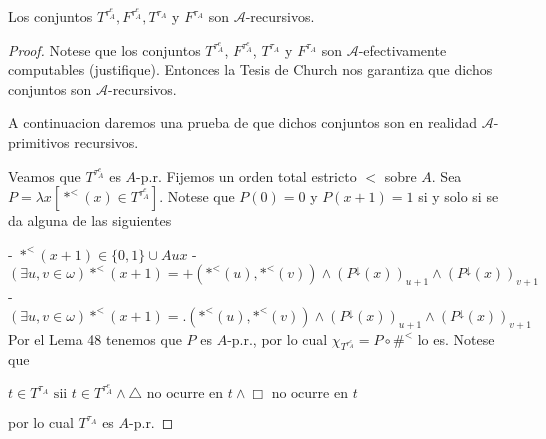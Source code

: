   \begin{lemma} \label{lemma_98}
    \PN Los conjuntos $T^{\tau_{A}^{e}}, F^{\tau_{A}^{e}}, T^{\tau_{A}}$ y $F^{\tau_{A}}$ son $\mathcal{A}$-recursivos.
  \end{lemma}
  \begin{proof}
    \PN Notese que los conjuntos \(T^{\tau _{A}^{e}}\), \(F^{\tau _{A}^{e}}\), \(T^{\tau _{A}}\) y \(F^{\tau _{A}}\) son
    \(\mathcal{A}\)-efectivamente computables (justifique). Entonces la Tesis de Church nos garantiza que dichos conjuntos
    son \(\mathcal{A}\)-recursivos.

    \PN A continuacion daremos una prueba de que dichos conjuntos son en realidad \( \mathcal{A}\)-primitivos recursivos.

    Veamos que $T^{\tau_{A}^{e}}$ es $A$-p.r. Fijemos un orden total estricto $ < $ sobre $A$. Sea $P=\lambda x[\ast ^{< }(x)\in T^{\tau_{A}^{e}}]$. Notese que $P(0)=0$ y $P(x+1)=1$ si y solo si se da alguna de las siguientes

    - $\ast ^{< }(x+1)\in \{0,1\}\cup Aux$
    - $(\exists u,v\in \omega )\ast ^{< }(x+1)=+(\mathrm{\ast }^{< }(u), \mathrm{\ast }^{< }(v))\wedge (P^{\downarrow }(x))_{u+1}\wedge (P^{\downarrow }(x))_{v+1}$
    - $(\exists u,v\in \omega )\ast ^{< }(x+1)=\mathrm{.}(\mathrm{\ast } ^{< }(u),\mathrm{\ast }^{< }(v))\wedge (P^{\downarrow }(x))_{u+1}\wedge (P^{\downarrow }(x))_{v+1}$
    Por el Lema 48 tenemos que $P$ es $A$-p.r., por lo cual $\chi _{T^{\tau_{A}^{e}}}=P\circ \#^{< }$ lo es. Notese que

    $\displaystyle t\in T^{\tau _{A}}\text{ sii }t\in T^{\tau_{A}^{e}}\wedge \triangle \text{ no ocurre en }t\wedge \Box \text{ no ocurre en }t $

    por lo cual $T^{\tau _{A}}$ es $A$-p.r.
  \end{proof}

